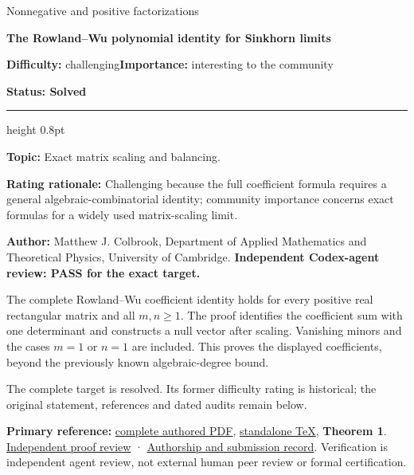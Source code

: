 \documentclass[11pt,a4paper]{article}
\makeatletter
\renewcommand{\subsection}{\Needspace{4\baselineskip}\@startsection{subsection}{2}{0pt}{9pt plus 1pt minus 1pt}{3pt}{\sffamily\bfseries\normalsize\color{ink}}}
\makeatother
\begin{document}
{\sffamily\small\color{muted}Nonnegative and positive
factorizations\par}
\vspace{3pt}
{\raggedright{}\sffamily\bfseries\fontsize{21}{24}\selectfont\color{ink}The
Rowland--Wu polynomial identity for Sinkhorn limits\par}
\vspace{7pt}
{\sffamily\small\textbf{Difficulty:} challenging\quad\textbf{Importance:} interesting
to the community\par}
{\sffamily\small\bfseries\color{accent}Status: Solved\par}
\vspace{4pt}
{\color{accent}\hrule height 0.8pt}
\vspace{6pt}
\textbf{Topic:} Exact matrix scaling and balancing.

\textbf{Rating rationale:} Challenging because the full coefficient
formula requires a general algebraic-combinatorial identity; community
importance concerns exact formulas for a widely used matrix-scaling
limit.

\subsection{Resolution --- 2026-09-11}\label{resolution-2026-09-11}

\textbf{Author:} Matthew J. Colbrook, Department of Applied Mathematics
and Theoretical Physics, University of Cambridge. \textbf{Independent
Codex-agent review: PASS for the exact target.}

The complete Rowland--Wu coefficient identity holds for every positive
real rectangular matrix and all \(m,n\ge1\). The proof identifies the
coefficient sum with one determinant and constructs a null vector after
scaling. Vanishing minors and the cases \(m=1\) or \(n=1\) are included.
This proves the displayed coefficients, beyond the previously known
algebraic-degree bound.

The complete target is resolved. Its former difficulty rating is
historical; the original statement, references and dated audits remain
below.

\textbf{Primary reference:}
\href{https://github.com/ajt60gaibb/OpenProblemsInNLA/blob/main/references/colbrook-factorization-2026-09-11/manuscripts/NM-04_sinkhorn_identity.pdf}{complete
authored PDF},
\href{https://github.com/ajt60gaibb/OpenProblemsInNLA/blob/main/references/colbrook-factorization-2026-09-11/manuscripts/NM-04_sinkhorn_identity.tex}{standalone
TeX}, \textbf{Theorem 1}.
\href{https://github.com/ajt60gaibb/OpenProblemsInNLA/blob/main/references/colbrook-factorization-2026-09-11/verification/reviews/NM-04-review.md}{Independent
proof review} ·
\href{https://github.com/ajt60gaibb/OpenProblemsInNLA/blob/main/references/colbrook-factorization-2026-09-11/README.md}{Authorship
and submission record}. Verification is independent agent review, not
external human peer review or formal certification.
\end{document}
